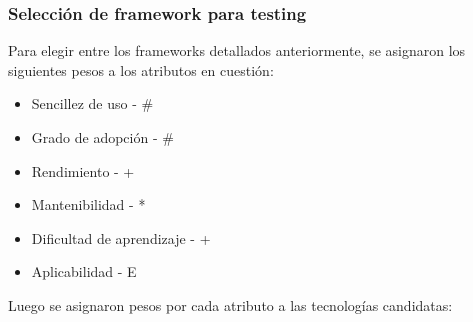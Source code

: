 \documentclass[twoside]{article}
\begin{document}
\subsubsection{Selección de framework para testing}
Para elegir entre los frameworks detallados anteriormente, se asignaron los siguientes pesos a los atributos en cuestión:
\begin{itemize}
    \item Sencillez de uso - \#
    \item Grado de adopción - \#
    \item Rendimiento - +
    \item Mantenibilidad - *
    \item Dificultad de aprendizaje - +
    \item Aplicabilidad - E
\end{itemize}
Luego se asignaron pesos por cada atributo a las tecnologías candidatas:
\end{document}
